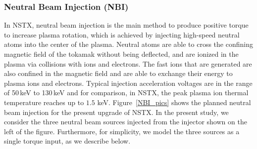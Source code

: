 \documentclass{iopart}
\begin{document}
\subsubsection{Neutral Beam Injection (NBI)}
 \label{NBIAM}

In NSTX, neutral beam injection is the main method to produce positive torque to increase plasma rotation, which is achieved  by injecting high-speed neutral atoms into the center of the plasma. 
Neutral atoms are able to cross the confining magnetic field of the tokamak without being deflected, and are ionized in the plasma via collisions with ions and electrons. The fast ions that are generated are also confined in the magnetic field and are able to exchange their energy to plasma ions and electrons. Typical injection acceleration voltages are in the range of 50\,keV to 130\,keV and for comparison, in NSTX, the peak plasma ion thermal temperature reaches up to $1.5$ keV.
Figure~{\ref{NBI_pics}} shows the planned neutral beam injection for the present
upgrade of NSTX. In the present study, we consider the three neutral beam
sources injected from the injector shown on the left of the figure.
Furthermore, for simplicity, we model the three sources as a single torque
input, as we describe below.
\end{document}
